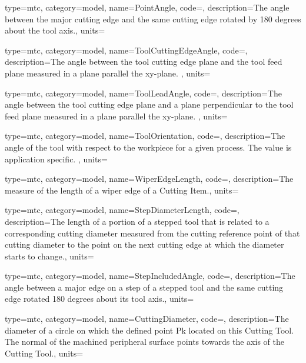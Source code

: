 {
  type=mtc,
  category=model,
  name={PointAngle},
  code=,
  description={The angle between the major cutting edge and the same cutting edge rotated by 180 degrees about the tool axis.},
  units=
}


{
  type=mtc,
  category=model,
  name={ToolCuttingEdgeAngle},
  code=,
  description={The angle between the tool cutting edge plane and the tool feed plane measured in a plane parallel the xy-plane. },
  units=
}


{
  type=mtc,
  category=model,
  name={ToolLeadAngle},
  code=,
  description={The angle between the tool cutting edge plane and a plane perpendicular to the tool feed plane measured in a plane parallel the xy-plane. },
  units=
}


{
  type=mtc,
  category=model,
  name={ToolOrientation},
  code=,
  description={The angle of the tool with respect to the workpiece for a given process. The value is application specific. },
  units=
}


{
  type=mtc,
  category=model,
  name={WiperEdgeLength},
  code=,
  description={The measure of the length of a wiper edge of a Cutting Item.},
  units=
}


{
  type=mtc,
  category=model,
  name={StepDiameterLength},
  code=,
  description={The length of a portion of a stepped tool that is related to a corresponding cutting diameter measured from the cutting reference point of that cutting diameter to the point on the next cutting edge at which the diameter starts to change.},
  units=
}


{
  type=mtc,
  category=model,
  name={StepIncludedAngle},
  code=,
  description={The angle between a major edge on a step of a stepped tool and the same cutting edge rotated 180 degrees about its tool axis.},
  units=
}


{
  type=mtc,
  category=model,
  name={CuttingDiameter},
  code=,
  description={The diameter of a circle on which the defined point Pk located on this Cutting Tool. The normal of the machined peripheral surface points towards the axis of the Cutting Tool.},
  units=
}



